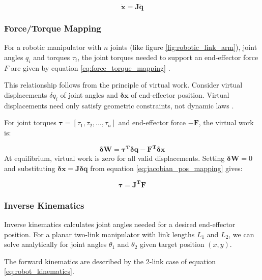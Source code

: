 \begin{equation}
    \label{eq:jacobian_speed_mapping}
    \bm{\dot x} = \bm{J}\bm{\dot q}
\end{equation}

    \subsubsection{Force/Torque Mapping}
    \label{sec:force_torque_mapping}

    For a robotic manipulator with $n$ joints (like figure \ref{fig:robotic_link_arm}), joint angles $q_i$ and torques $\tau_i$, the joint torques needed to support an end-effector force $F$ are given by equation \ref{eq:force_torque_mapping} \cite{ASADA_LECTURE_NOTES}.

    This relationship follows from the principle of virtual work. Consider virtual displacements $\delta q_i$ of joint angles and $\bm{\delta x}$ of end-effector position. Virtual displacements need only satisfy geometric constraints, not dynamic laws \cite{ASADA_LECTURE_NOTES}.

    For joint torques $\bm{\tau} = [\tau_1, \tau_2, ..., \tau_n]$ and end-effector force $\bm{-F}$, the virtual work is:

    \begin{equation}
        \label{eq:virtual_work}
        \bm{\delta W} = \bm{\tau^T\delta q -F^T\delta x} 
    \end{equation}
    At equilibrium, virtual work is zero for all valid displacements. Setting $\bm{\delta W} = 0$ and substituting $\bm{\delta x} = \bm{J}\bm{\delta q}$ from equation \ref{eq:jacobian_pos_mapping} gives:

    \begin{equation}
        \label{eq:force_torque_mapping}
        \bm{\tau} = \bm{J^T F}
    \end{equation}

    \subsubsection{Inverse Kinematics}
    Inverse kinematics calculates joint angles needed for a desired end-effector position. For a planar two-link manipulator with link lengths \(L_1\) and \(L_2\), we can solve analytically for joint angles \(\theta_1\) and \(\theta_2\) given target position \((x,y)\).

    The forward kinematics are described by the 2-link case of equation \ref{eq:robot_kinematics}.
    

